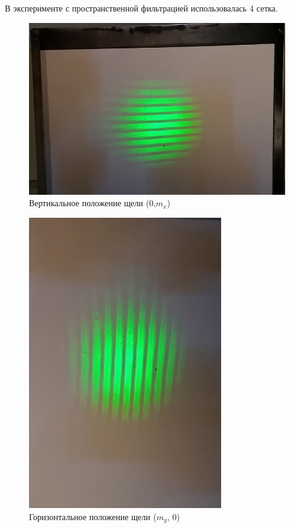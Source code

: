 \documentclass[a4paper, 12pt]{article}
\begin{document}
В эксперименте с пространственной фильтрацией использовалась 4 сетка.

\begin{figure}[h!]
\begin{center}
\includegraphics[width=1\textwidth]{Горизонтальный.jpg}
\end{center}
\caption{Вертикальное положение щели (0,$m_x$)} \label{Горизонтальные полосы}
\end{figure}

\begin{figure}[h!]
\begin{center}
\includegraphics[width=0.75\textwidth]{Вертикальные.jpg}
\end{center}
\caption{Горизонтальное положение щели ($m_y$, 0)} \label{Вертикальные полосы}
\end{figure}
\end{document}
